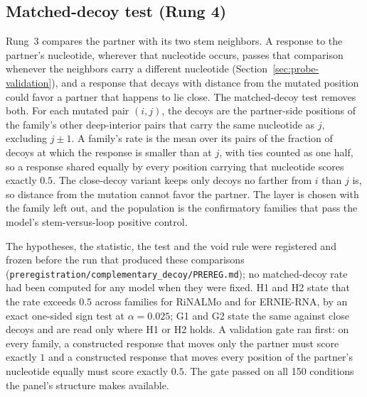 \documentclass[11pt]{article}
\begin{document}
\subsection{Matched-decoy test (Rung 4)}
\label{sec:decoy-results}

Rung~3 compares the partner with its two stem neighbors. A response to the
partner's nucleotide, wherever that nucleotide occurs, passes that comparison
whenever the neighbors carry a different nucleotide
(Section~\ref{sec:probe-validation}), and a response that decays with distance
from the mutated position could favor a partner that happens to lie close. The
matched-decoy test removes both. For each mutated pair $(i, j)$, the decoys are
the partner-side positions of the family's other deep-interior pairs that carry
the same nucleotide as $j$, excluding $j \pm 1$. A family's rate is the mean
over its pairs of the fraction of decoys at which the response is smaller than
at $j$, with ties counted as one half, so a response shared equally by every
position carrying that nucleotide scores exactly $0.5$. The close-decoy
variant keeps only decoys no farther from $i$ than $j$ is, so distance from the
mutation cannot favor the partner. The layer is chosen with the family left
out, and the population is the confirmatory families that pass the model's
stem-versus-loop positive control.

The hypotheses, the statistic, the test and the void rule were registered and
frozen before the run that produced these comparisons
(\texttt{preregistration/complementary\_decoy/PREREG.md}); no matched-decoy
rate had been computed for any model when they were fixed. H1 and H2 state that
the rate exceeds $0.5$ across families for RiNALMo and for ERNIE-RNA, by an
exact one-sided sign test at $\alpha = 0.025$; G1 and G2 state the same against
close decoys and are read only where H1 or H2 holds. A validation gate ran
first: on every family, a constructed response that moves only the partner
must score exactly $1$ and a constructed response that moves every position of
the partner's nucleotide equally must score exactly $0.5$. The gate passed on
all 150 conditions the panel's structure makes available.


\end{document}
